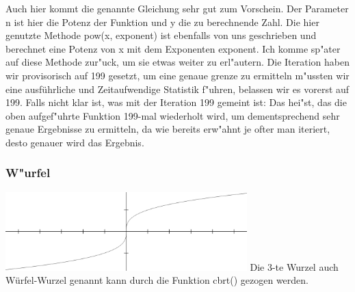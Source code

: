 \documentclass{scrartcl}
\begin{document}
Auch hier kommt die genannte Gleichung sehr gut zum Vorschein. Der Parameter n ist hier die Potenz der Funktion und y die zu berechnende Zahl. Die hier genutzte Methode pow(x, exponent) ist ebenfalls von uns geschrieben und berechnet eine Potenz von x mit dem Exponenten exponent. Ich komme sp"ater auf diese Methode zur"uck, um sie etwas weiter zu erl"autern. Die Iteration haben wir provisorisch auf 199 gesetzt, um eine genaue grenze zu ermitteln m"ussten wir eine ausführliche und Zeitaufwendige Statistik f"uhren, belassen wir es vorerst auf 199.\newline
Falls nicht klar ist, was mit der Iteration 199 gemeint ist: Das hei"st, das die oben aufgef"uhrte Funktion 199-mal wiederholt wird, um dementsprechend sehr genaue Ergebnisse zu ermitteln, da wie bereits erw"ahnt \glqq je \grqq ofter man iteriert, desto genauer wird das Ergebnis\grqq .\newline
\subsubsection{W"urfel}
\includegraphics[width=0.7\textwidth]{images/functions/cube_wurzel.png}\newline
Die 3-te Wurzel auch Würfel-Wurzel genannt kann durch die Funktion cbrt() gezogen werden.
\end{document}
